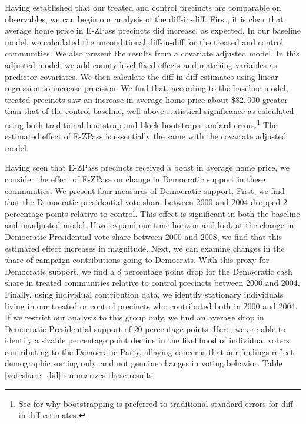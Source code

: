 
Having established that our treated and control precincts are comparable on observables, we can begin our analysis of the diff-in-diff. First, it is clear that average home price in E-ZPass precincts did increase, as expected. In our baseline model, we calculated the unconditional diff-in-diff for the treated and control communities. We also present the results from a covariate adjusted model. In this adjusted model, we add county-level fixed effects and matching variables as predictor covariates. We then calculate the diff-in-diff estimates using linear regression to increase precision. We find that, according to the baseline model, treated precincts saw an increase in average home price about $\$82,000$ greater than that of the control baseline, well above statistical significance as calculated using both traditional bootstrap and block bootstrap standard errors.\footnote{See \textcite{Bertrand2004} for why bootstrapping is preferred to traditional standard errors for diff-in-diff estimates.}  The estimated effect of E-ZPass is essentially the same with the covariate adjusted model. 

Having seen that E-ZPass precincts received a boost in average home price, we consider the effect of E-ZPass on change in Democratic support in these communities. We present four measures of Democratic support. First, we find that the Democratic presidential vote share between $2000$ and $2004$ dropped $2$ percentage points relative to control. This effect is significant in both the baseline and unadjusted model. If we expand our time horizon and look at the change in Democratic Presidential vote share between $2000$ and $2008$, we find that this estimated effect increases in magnitude. Next, we can examine changes in the share of campaign contributions going to Democrats. With this proxy for Democratic support, we find a $8$ percentage point drop for the Democratic cash share in treated communities relative to control precincts between 2000 and 2004. Finally, using individual contribution data, we identify stationary individuals living in our treated or control precincts who contributed both in 2000 and 2004. If we restrict our analysis to this group only, we find an average drop in Democratic Presidential support of $20$ percentage points. Here, we are able to identify a sizable percentage point decline in the likelihood of individual voters contributing to the Democratic Party, allaying concerns that our findings reflect demographic sorting only, and not genuine changes in voting behavior. Table \ref{voteshare_did} summarizes these results. 

